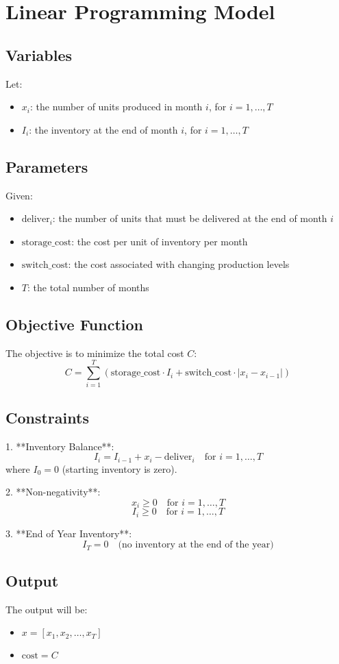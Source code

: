 \documentclass{article}
\begin{document}
\section*{Linear Programming Model}

\subsection*{Variables}
Let:
\begin{itemize}
    \item \( x_i \): the number of units produced in month \( i \), for \( i = 1, \ldots, T \)
    \item \( I_i \): the inventory at the end of month \( i \), for \( i = 1, \ldots, T \)
\end{itemize}

\subsection*{Parameters}
Given:
\begin{itemize}
    \item \( \text{deliver}_i \): the number of units that must be delivered at the end of month \( i \)
    \item \( \text{storage\_cost} \): the cost per unit of inventory per month
    \item \( \text{switch\_cost} \): the cost associated with changing production levels
    \item \( T \): the total number of months
\end{itemize}

\subsection*{Objective Function}
The objective is to minimize the total cost \( C \):
\[
C = \sum_{i=1}^{T} \left( \text{storage\_cost} \cdot I_i + \text{switch\_cost} \cdot |x_{i} - x_{i-1}| \right)
\]

\subsection*{Constraints}

1. **Inventory Balance**:
   \[
   I_i = I_{i-1} + x_i - \text{deliver}_i \quad \text{for } i = 1, \ldots, T
   \]
   where \( I_0 = 0 \) (starting inventory is zero).

2. **Non-negativity**:
   \[
   x_i \geq 0 \quad \text{for } i = 1, \ldots, T
   \]
   \[
   I_i \geq 0 \quad \text{for } i = 1, \ldots, T
   \]

3. **End of Year Inventory**:
   \[
   I_T = 0 \quad \text{(no inventory at the end of the year)}
   \]

\subsection*{Output}
The output will be:
\begin{itemize}
    \item \( x = [x_1, x_2, \ldots, x_T] \)
    \item \( \text{cost} = C \)
\end{itemize}
\end{document}

